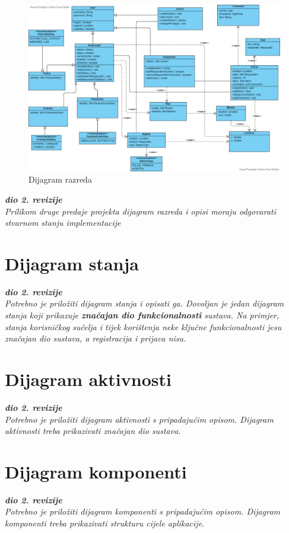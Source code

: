 			\begin{figure}[H]
				\includegraphics[scale=0.4]{slike/classes.PNG}
				\centering
				\caption{Dijagram razreda}
				\label{fig:razredi}
			\end{figure}
			
			\textbf{\textit{dio 2. revizije}}\\			
			
			\textit{Prilikom druge predaje projekta dijagram razreda i opisi moraju odgovarati stvarnom stanju implementacije}
			
			
			
			\eject
		
		\section{Dijagram stanja}
			
			
			\textbf{\textit{dio 2. revizije}}\\
			
			\textit{Potrebno je priložiti dijagram stanja i opisati ga. Dovoljan je jedan dijagram stanja koji prikazuje \textbf{značajan dio funkcionalnosti} sustava. Na primjer, stanja korisničkog sučelja i tijek korištenja neke ključne funkcionalnosti jesu značajan dio sustava, a registracija i prijava nisu. }
			
			
			\eject 
		
		\section{Dijagram aktivnosti}
			
			\textbf{\textit{dio 2. revizije}}\\
			
			 \textit{Potrebno je priložiti dijagram aktivnosti s pripadajućim opisom. Dijagram aktivnosti treba prikazivati značajan dio sustava.}
			
			\eject
		\section{Dijagram komponenti}
		
			\textbf{\textit{dio 2. revizije}}\\
		
			 \textit{Potrebno je priložiti dijagram komponenti s pripadajućim opisom. Dijagram komponenti treba prikazivati strukturu cijele aplikacije.}